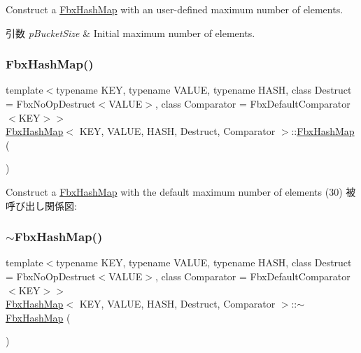 Construct a \hyperlink{class_fbx_hash_map}{Fbx\+Hash\+Map} with an user-\/defined maximum number of elements. 
\begin{DoxyParams}{引数}
{\em p\+Bucket\+Size} & Initial maximum number of elements. \\
\hline
\end{DoxyParams}
\mbox{\label{class_fbx_hash_map_a398c0d23f439d50d12ff45f04d9c57f2}} 
\subsubsection{\texorpdfstring{Fbx\+Hash\+Map()}{FbxHashMap()}\hspace{0.1cm}{\footnotesize\ttfamily [2/2]}}
{\footnotesize\ttfamily template$<$typename K\+EY, typename V\+A\+L\+UE, typename H\+A\+SH, class Destruct = Fbx\+No\+Op\+Destruct$<$\+V\+A\+L\+U\+E$>$, class Comparator = Fbx\+Default\+Comparator$<$\+K\+E\+Y$>$$>$ \\
\hyperlink{class_fbx_hash_map}{Fbx\+Hash\+Map}$<$ K\+EY, V\+A\+L\+UE, H\+A\+SH, Destruct, Comparator $>$\+::\hyperlink{class_fbx_hash_map}{Fbx\+Hash\+Map} (\begin{DoxyParamCaption}{ }\end{DoxyParamCaption})}

Construct a \hyperlink{class_fbx_hash_map}{Fbx\+Hash\+Map} with the default maximum number of elements (30) 被呼び出し関係図\+:
\mbox{\label{class_fbx_hash_map_a9b75e6940b7ebb7c82628117ce8479e2}} 
\subsubsection{\texorpdfstring{$\sim$\+Fbx\+Hash\+Map()}{~FbxHashMap()}}
{\footnotesize\ttfamily template$<$typename K\+EY, typename V\+A\+L\+UE, typename H\+A\+SH, class Destruct = Fbx\+No\+Op\+Destruct$<$\+V\+A\+L\+U\+E$>$, class Comparator = Fbx\+Default\+Comparator$<$\+K\+E\+Y$>$$>$ \\
\hyperlink{class_fbx_hash_map}{Fbx\+Hash\+Map}$<$ K\+EY, V\+A\+L\+UE, H\+A\+SH, Destruct, Comparator $>$\+::$\sim$\hyperlink{class_fbx_hash_map}{Fbx\+Hash\+Map} (\begin{DoxyParamCaption}{ }\end{DoxyParamCaption})}

